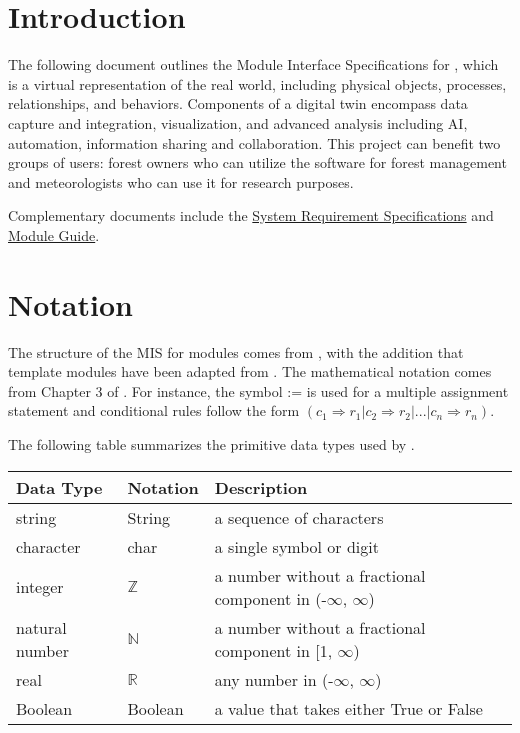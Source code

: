 \documentclass[12pt, titlepage]{article}
\begin{document}
\tableofcontents

\newpage


\section{Introduction}

The following document outlines the Module Interface 
Specifications for \progname{}, which is a virtual 
representation of the real world, including physical objects, 
processes, relationships, and behaviors. Components of a 
digital twin encompass data capture
and integration, visualization, and advanced analysis 
including AI, automation, information sharing and 
collaboration. This project can benefit two groups 
of users: forest owners who can utilize the software for forest management and meteorologists who can use it for research purposes. 

\noindent Complementary documents include the \href{https://github.com/wuj187/DigitalTwinCAS/blob/main/docs/SRS/SRS.pdf}{System 
Requirement Specifications} and \href{https://github.com/wuj187/DigitalTwinCAS/blob/main/docs/Design/Software-Architecture-Design/MG.pdf}{Module Guide}. 

\section{Notation}

\noindent The structure of the MIS for modules comes from \citet{HoffmanAndStrooper1995},
with the addition that template modules have been adapted from
\cite{GhezziEtAl2003}.  The mathematical notation comes from 
Chapter 3 of
\citet{HoffmanAndStrooper1995}.  For instance, the symbol := 
is used for a multiple assignment statement and conditional 
rules follow the form $(c_1 \Rightarrow r_1 | c_2 \Rightarrow
r_2 | ... | c_n \Rightarrow r_n )$.

The following table summarizes the primitive data types used by \progname. 

\begin{center}
\renewcommand{\arraystretch}{1.2}
\noindent 
\begin{tabular}{l l p{7.5cm}} 
\toprule 
\textbf{Data Type} & \textbf{Notation} & \textbf{Description}\\ 
\midrule
string & String & a sequence of characters\\
character & char & a single symbol or digit\\
integer & $\mathbb{Z}$ & a number without a fractional component in (-$\infty$, $\infty$) \\
natural number & $\mathbb{N}$ & a number without a fractional component in [1, $\infty$) \\
real & $\mathbb{R}$ & any number in (-$\infty$, $\infty$)\\
Boolean & Boolean & a value that takes either True or False\\
\bottomrule
\end{tabular} 
\end{center}
\end{document}
